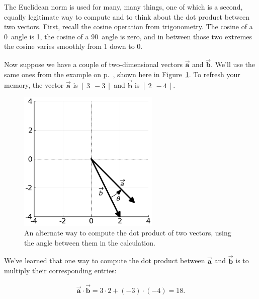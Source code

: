 The Euclidean norm is used for many, many things, one of which is a second,
equally legitimate way to compute and to think about the dot product between
two vectors. First, recall the cosine operation from trigonometry. The cosine
of a 0\textdegree\ angle is 1, the cosine of a 90\textdegree\ angle is zero,
and in between those two extremes the cosine varies smoothly from 1 down to 0.

Now suppose we have a couple of two-dimensional vectors
$\overrightarrow{\textbf{a}}$ and $\overrightarrow{\textbf{b}}$. We'll use the
same ones from the example on p.~\pageref{fig:dotProduct4}, shown here in
Figure~\ref{fig:dotProduct4WithAngle}. To refresh your memory, the vector
$\overrightarrow{\textbf{a}}$ is $[\ 3\ \ -3\ ]$ and
$\overrightarrow{\textbf{b}}$ is $[\ 2\ \ -4\ ]$.


\begin{figure}[ht]
\centering
\includegraphics[width=0.6\textwidth]{dotProductWithAngle.png}
\caption{An alternate way to compute the dot product of two vectors, using the
angle between them in the calculation.}
\label{fig:dotProduct4WithAngle}
\end{figure}

We've learned that one way to compute the dot product between
$\overrightarrow{\textbf{a}}$ and $\overrightarrow{\textbf{b}}$ is to multiply
their corresponding entries:

\vspace{-.25in}
\begin{align*}
\overrightarrow{\textbf{a}} \cdot \overrightarrow{\textbf{b}} =
3\cdot2 + (-3)\cdot(-4) = 18.
\end{align*}
\vspace{-.25in}

